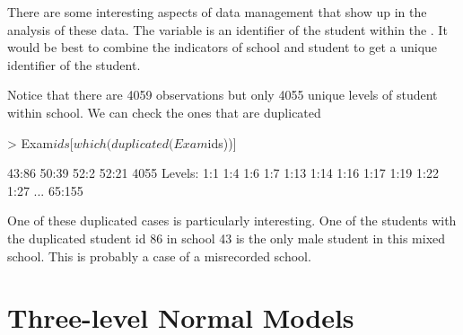 \documentclass[12pt]{article}
\begin{document}
There are some interesting aspects of data management that show up in
the analysis of these data.  The  variable is an
identifier of the student within the .  It would be best
to combine the indicators of school and student to get a unique
identifier of the student.

\begin{Schunk}
\end{Schunk}
Notice that there are 4059 observations but only 4055 unique levels of
student within school.  We can check the ones that are duplicated
\begin{Schunk}
\begin{Sinput}
> Exam$ids[which(duplicated(Exam$ids))]
\end{Sinput}
\begin{Soutput}
[1] 43:86 50:39 52:2  52:21
4055 Levels: 1:1 1:4 1:6 1:7 1:13 1:14 1:16 1:17 1:19 1:22 1:27 ... 65:155
\end{Soutput}
\end{Schunk}

One of these duplicated cases is particularly interesting.  One of the
students with the duplicated student id 86 in school 43 is the only
male student in this mixed school.  This is probably a case of a
misrecorded school.



\section{Three-level Normal Models}
\label{sec:three-level}
\end{document}
